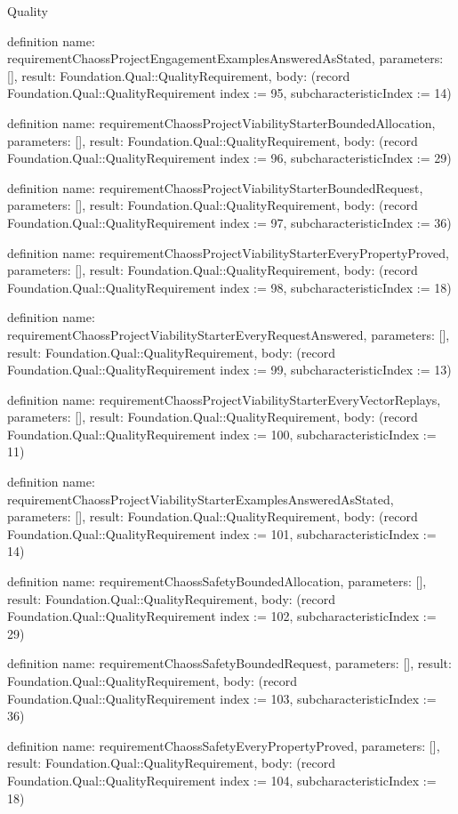 \begin{lexlean}{Quality}
\begin{semanticmodule}
definition{
  name: requirementChaossProjectEngagementExamplesAnsweredAsStated,
  parameters: [],
  result: Foundation.Qual::QualityRequirement,
  body: (record Foundation.Qual::QualityRequirement {index := 95, subcharacteristicIndex := 14})
}

definition{
  name: requirementChaossProjectViabilityStarterBoundedAllocation,
  parameters: [],
  result: Foundation.Qual::QualityRequirement,
  body: (record Foundation.Qual::QualityRequirement {index := 96, subcharacteristicIndex := 29})
}

definition{
  name: requirementChaossProjectViabilityStarterBoundedRequest,
  parameters: [],
  result: Foundation.Qual::QualityRequirement,
  body: (record Foundation.Qual::QualityRequirement {index := 97, subcharacteristicIndex := 36})
}

definition{
  name: requirementChaossProjectViabilityStarterEveryPropertyProved,
  parameters: [],
  result: Foundation.Qual::QualityRequirement,
  body: (record Foundation.Qual::QualityRequirement {index := 98, subcharacteristicIndex := 18})
}

definition{
  name: requirementChaossProjectViabilityStarterEveryRequestAnswered,
  parameters: [],
  result: Foundation.Qual::QualityRequirement,
  body: (record Foundation.Qual::QualityRequirement {index := 99, subcharacteristicIndex := 13})
}

definition{
  name: requirementChaossProjectViabilityStarterEveryVectorReplays,
  parameters: [],
  result: Foundation.Qual::QualityRequirement,
  body: (record Foundation.Qual::QualityRequirement {index := 100, subcharacteristicIndex := 11})
}

definition{
  name: requirementChaossProjectViabilityStarterExamplesAnsweredAsStated,
  parameters: [],
  result: Foundation.Qual::QualityRequirement,
  body: (record Foundation.Qual::QualityRequirement {index := 101, subcharacteristicIndex := 14})
}

definition{
  name: requirementChaossSafetyBoundedAllocation,
  parameters: [],
  result: Foundation.Qual::QualityRequirement,
  body: (record Foundation.Qual::QualityRequirement {index := 102, subcharacteristicIndex := 29})
}

definition{
  name: requirementChaossSafetyBoundedRequest,
  parameters: [],
  result: Foundation.Qual::QualityRequirement,
  body: (record Foundation.Qual::QualityRequirement {index := 103, subcharacteristicIndex := 36})
}

definition{
  name: requirementChaossSafetyEveryPropertyProved,
  parameters: [],
  result: Foundation.Qual::QualityRequirement,
  body: (record Foundation.Qual::QualityRequirement {index := 104, subcharacteristicIndex := 18})
}


\end{semanticmodule}
\end{lexlean}
